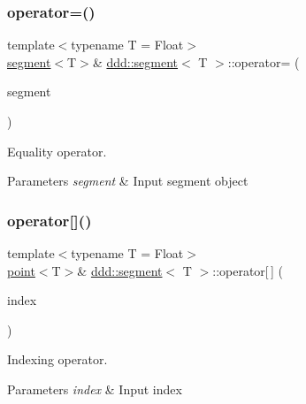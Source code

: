 \subsubsection{\texorpdfstring{operator=()}{operator=()}}
{\footnotesize\ttfamily template$<$typename T = Float$>$ \\
\hyperlink{classddd_1_1segment}{segment}$<$T$>$\& \hyperlink{classddd_1_1segment}{ddd\+::segment}$<$ T $>$\+::operator= (\begin{DoxyParamCaption}\item[{const \hyperlink{classddd_1_1segment}{segment}$<$ T $>$ \&}]{segment }\end{DoxyParamCaption})\hspace{0.3cm}{\ttfamily [inline]}}



Equality operator. 


\begin{DoxyParams}{Parameters}
{\em segment} & Input segment object \\
\hline
\end{DoxyParams}
\mbox{\label{classddd_1_1segment_a38fb73f1bb682c0446eef1cce0cb5f21}} 
\subsubsection{\texorpdfstring{operator[]()}{operator[]()}\hspace{0.1cm}{\footnotesize\ttfamily [1/2]}}
{\footnotesize\ttfamily template$<$typename T = Float$>$ \\
\hyperlink{classddd_1_1point}{point}$<$T$>$\& \hyperlink{classddd_1_1segment}{ddd\+::segment}$<$ T $>$\+::operator\mbox{[}$\,$\mbox{]} (\begin{DoxyParamCaption}\item[{const std\+::size\+\_\+t \&}]{index }\end{DoxyParamCaption})\hspace{0.3cm}{\ttfamily [inline]}}



Indexing operator. 


\begin{DoxyParams}{Parameters}
{\em index} & Input index \\
\hline
\end{DoxyParams}
\mbox{\label{classddd_1_1segment_a7f491fcefb2c3d8f805b7a27ed93395f}} 
